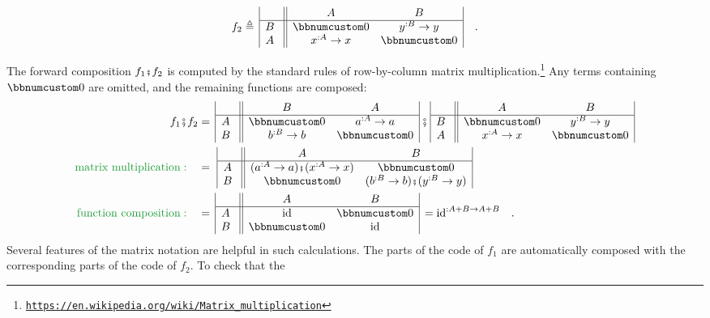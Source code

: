 \vspace{-1.5\baselineskip}
\[
f_{2}\triangleq\,\begin{array}{|c||cc|}
 & A & B\\
\hline B~ & \bbnum 0 & y^{:B}\rightarrow y\\
A~ & x^{:A}\rightarrow x & \bbnum 0
\end{array}\quad.
\]
\vspace{-0.8\baselineskip}

\noindent The forward composition $f_{1}\bef f_{2}$ is computed by
the standard rules of row-by-column matrix multiplication.\footnote{\texttt{\href{https://en.wikipedia.org/wiki/Matrix_multiplication}{https://en.wikipedia.org/wiki/Matrix\_multiplication}}}
Any terms containing $\bbnum 0$ are omitted, and the remaining functions
are composed:
\begin{align*}
f_{1}\bef f_{2} & =\,\begin{array}{|c||cc|}
 & B & A\\
\hline A~ & \bbnum 0 & a^{:A}\rightarrow a\\
B~ & b^{:B}\rightarrow b & \bbnum 0
\end{array}\,\bef\,\begin{array}{|c||cc|}
 & A & B\\
\hline B~ & \bbnum 0 & y^{:B}\rightarrow y\\
A~ & x^{:A}\rightarrow x & \bbnum 0
\end{array}\\
{\color{greenunder}\text{matrix multiplication}:}\quad & =\,\,\begin{array}{|c||cc|}
 & A & B\\
\hline A~ & (a^{:A}\rightarrow a)\bef(x^{:A}\rightarrow x) & \bbnum 0\\
B~ & \bbnum 0 & (b^{:B}\rightarrow b)\bef(y^{:B}\rightarrow y)
\end{array}\\
{\color{greenunder}\text{function composition}:}\quad & =\,\begin{array}{|c||cc|}
 & A & B\\
\hline A~ & \text{id} & \bbnum 0\\
B~ & \bbnum 0 & \text{id}
\end{array}\,=\text{id}^{:A+B\rightarrow A+B}\quad.
\end{align*}
Several features of the matrix notation are helpful in such calculations.
The parts of the code of $f_{1}$ are automatically composed with
the corresponding parts of the code of $f_{2}$. To check that the
